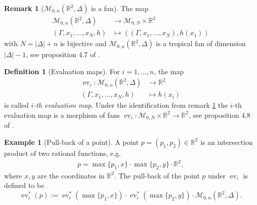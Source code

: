 \documentclass[11pt,reqno,a4]{amsart}
\theoremstyle{dotless}
\theoremstyle{definition}
\newtheorem{definition}[corollary]{Definition}
\newtheorem{remark}[corollary]{Remark}
\newtheorem{example}[corollary]{Example}
\newcommand{\ev}{\operatorname{ev}}
\begin{document}
\begin{remark}[$\mathcal{M}_{0,n}\left(\mathbb{R}^2,\Delta\right)$ is a fan]\label{remark:identification:stable_maps_abstract_maps}
The map
\begin{align*}
\mathcal{M}_{0,n}\left(\mathbb{R}^2,\Delta\right) &\to \mathcal{M}_{0,N}\times\mathbb{R}^2\\
(\Gamma,x_1,\dots,x_N,h) &\mapsto \left(\left(\Gamma,x_1,\dots,x_N\right),h(x_1)\right)
\end{align*}
with $N=|\Delta|+n$ is bijective and $\mathcal{M}_{0,n}\left(\mathbb{R}^2,\Delta\right)$ is a tropical fan of dimension $|\Delta|-1$, see proposition 4.7 of \cite{GathmannKerberMarkwig}.
\end{remark}

\begin{definition}[Evaluation maps]
For $i=1,\dots,n$, the map
\begin{align*}
\operatorname{ev}_i:\mathcal{M}_{0,n}\left(\mathbb{R}^2,\Delta\right) &\to \mathbb{R}^2\\
(\Gamma,x_1,\dots,x_N,h) &\mapsto h(x_i)
\end{align*}
is called \textit{$i$-th evaluation map}. Under the identification from remark \ref{remark:identification:stable_maps_abstract_maps} the $i$-th evaluation map is a morphism of fans $\operatorname{ev}_i:\mathcal{M}_{0,N}\times\mathbb{R}^2 \to \mathbb{R}^2$, see proposition 4.8 of \cite{GathmannKerberMarkwig}.
\end{definition}

\begin{example}[Pull-back of a point]\label{example:pull_back_point}
A point $p=(p_1,p_2)\in\mathbb{R}^2$ is an intersection product of two rational functions, e.g.\
\begin{align*}
p=\operatorname{max}\{p_1,x\}\cdot\operatorname{max}\{p_2,y\}\cdot\mathbb{R}^2,
\end{align*}
 where $x,y$ are the coordinates in $\mathbb{R}^2$. The pull-back of the point $p$ under $\ev_i$ is defined to be
 $$\ev_i^*(p):= \ev_i^*(\max\{p_1,x\})\cdot \ev_i^*(\max\{p_2,y\})\cdot \mathcal{M}_{0,n}\left(\mathbb{R}^2,\Delta\right).
 $$
\end{example}
\end{document}
